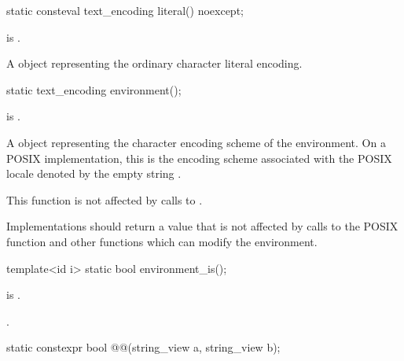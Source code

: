 %
\begin{itemdecl}
static consteval text_encoding literal() noexcept;
\end{itemdecl}

\begin{itemdescr}
\pnum
\mandates
{} is .

\pnum
\returns
A  object representing
the ordinary character literal encoding.
\end{itemdescr}

%
\begin{itemdecl}
static text_encoding environment();
\end{itemdecl}

\begin{itemdescr}
\pnum
\mandates
{} is .

\pnum
\returns
A  object representing
the 
character encoding scheme of the environment.
On a POSIX implementation, this is the encoding scheme associated with
the POSIX locale denoted by the empty string .

\pnum
\begin{note}
This function is not affected by calls to .
\end{note}

\pnum
\recommended
Implementations should return a value that is not affected by calls to
the POSIX function  and
other functions which can modify the environment.
\end{itemdescr}

%
\begin{itemdecl}
template<id i>
  static bool environment_is();
\end{itemdecl}

\begin{itemdescr}
\pnum
\mandates
{} is .

\pnum
\returns
{}.
\end{itemdescr}

%
\begin{itemdecl}
static constexpr bool @@(string_view a, string_view b);
\end{itemdecl}

